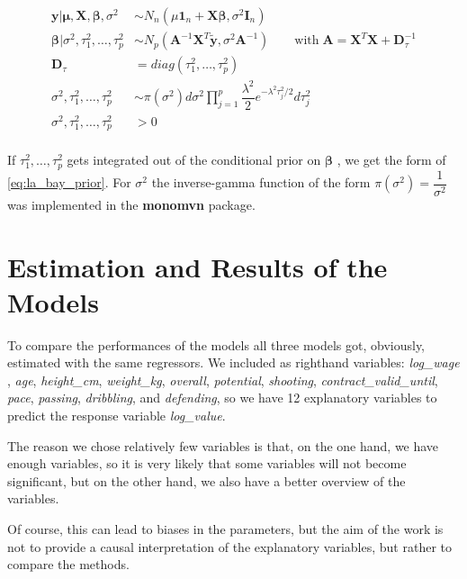 \documentclass[12pt,a4paper]{article}
\begin{document}
\begin{align*}
  \pmb{y|\mu}, \pmb{X}, \pmb{\beta}, \sigma^2 & \sim N_n (\mu \pmb{1}_n + \pmb{X \beta}, \sigma^2  \pmb{I}_n)   \nonumber\\
  \pmb{\beta} | \sigma^2, \tau^2_1 , \ldots , \tau^2_p & \sim N_p (\pmb{A}^{-1} \pmb{X}^T \tilde{\pmb{y}}  , \sigma^2 \pmb{A}^{-1}) \qquad \text{with} \; \pmb{A} = \pmb{X}^T \pmb{X} + \pmb{D}^{-1}_{\tau} \nonumber \\
  \pmb{D}_{\tau} & = diag(\tau^2_1 , \ldots , \tau^2_p) \nonumber \\ 
  \sigma^2, \tau^2_1 , \ldots , \tau^2_p & \sim \pi \left( \sigma^2 \right) d \sigma^2 \prod_{j = 1}^{p} \dfrac{\lambda^2}{2}e^{- \lambda^2 \tau^2_j /2} d \tau^2_j \nonumber \\
  \sigma^2, \tau^2_1 , \ldots , \tau^2_p & > 0 \nonumber \\
\end{align*}

If \(\tau^2_1 , \ldots , \tau^2_p\) gets integrated out of the
conditional prior on \(\pmb{\beta}\) , we get the form of
\eqref{eq:la_bay_prior}. For \(\sigma^2\) the inverse-gamma function of
the form \(\pi \left( \sigma^2 \right) = \dfrac{1}{\sigma^2}\) was
implemented in the \textbf{monomvn} package.

\newpage

\hypertarget{estimation-and-results-of-the-models}{%
\section{Estimation and Results of the
Models}\label{estimation-and-results-of-the-models}}

To compare the performances of the models all three models got,
obviously, estimated with the same regressors. We included as righthand
variables: \emph{log\_wage} , \emph{age}, \emph{height\_cm},
\emph{weight\_kg}, \emph{overall}, \emph{potential}, \emph{shooting},
\emph{contract\_valid\_until}, \emph{pace}, \emph{passing},
\emph{dribbling}, and \emph{defending}, so we have 12 explanatory
variables to predict the response variable \emph{log\_value}.

The reason we chose relatively few variables is that, on the one hand,
we have enough variables, so it is very likely that some variables will
not become significant, but on the other hand, we also have a better
overview of the variables.

Of course, this can lead to biases in the parameters, but the aim of the
work is not to provide a causal interpretation of the explanatory
variables, but rather to compare the methods.
\end{document}
